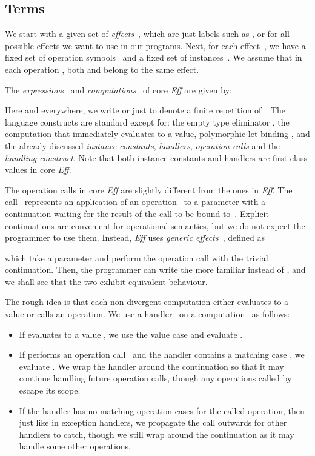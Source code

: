\documentclass{LMCS}
\newcommand{\Eff}{\emph{Eff}\xspace}
\begin{document}
\subsection{Terms}

We start with a given set of \emph{effects}~,
which are just labels such as ,  or 
for all possible effects we want to use in our programs.
Next, for each effect~, we have a fixed set  of operation symbols~
and a fixed set  of instances~.
We assume that in each operation ,
both  and  belong to the same effect.

The \emph{expressions}~ and \emph{computations}~ of core \Eff are given by:

Here and everywhere, we write  or just  to denote a finite repetition of~.
The language constructs are standard except for:
the empty type eliminator ,
the computation  that immediately evaluates to a value,
polymorphic let-binding ,
and the already discussed \emph{instance constants}, \emph{handlers}, \emph{operation calls} and the \emph{handling construct}.
Note that both instance constants and handlers are first-class values in core \Eff.

The operation calls in core \Eff are slightly different from the ones in \Eff.
The call~ represents an application
of an operation~ to a parameter 
with a continuation  waiting for the result of the call to be bound to~.
Explicit continuations are convenient for operational semantics,
but we do not expect the programmer to use them.
Instead, \Eff uses \emph{generic effects}~\cite{plotkin2003algebraic}, defined as

which take a parameter and perform the operation call with the trivial continuation.
Then, the programmer can write the more familiar 
instead of ,
and we shall see that the two exhibit equivalent behaviour.  

The rough idea is that each non-divergent computation either evaluates to a value or calls an operation.
We use a handler~ on a computation~ as follows:
\begin{itemize}
\item
  If  evaluates to a value , we use the value case and evaluate .
\item
  If  performs an operation call~
  and the handler contains a matching case ,
  we evaluate .
  We wrap the handler  around the continuation so that it may continue handling future operation calls,
  though any operations called by  escape its scope.
\item
  If the handler has no matching operation cases for the called operation,
  then just like in exception handlers,
  we propagate the call outwards for other handlers to catch,
  though we still wrap  around the continuation as it may handle some other operations.
\end{itemize}
\end{document}

